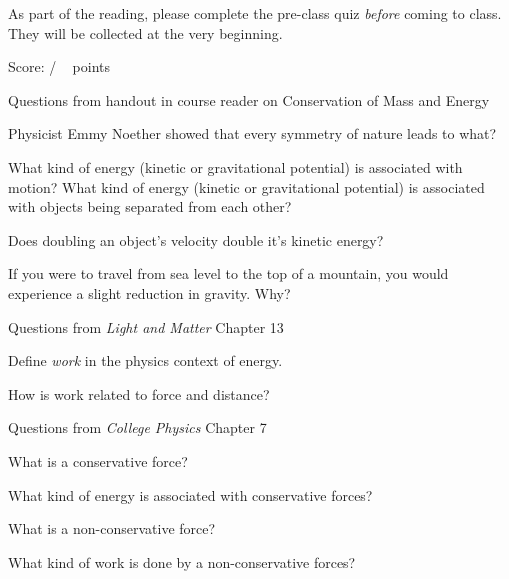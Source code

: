 \documentclass[addpoints,12pt]{exam}
\begin{document}
As part of the reading, please complete the pre-class quiz \textit{before} coming to class. They will be collected at the very beginning.
 
\clearpage

\begin{flushright}
Score: \hspace{0.2in} / \numpoints ~ points
\end{flushright}

\noindent Questions from handout in course reader on Conservation of Mass and Energy

\begin{questions}

\question[1]
Physicist Emmy Noether showed that every symmetry of nature leads to what?
\fillwithlines{0.5in}

\question[1]
What kind of energy (kinetic or gravitational potential) is associated with motion? What kind of energy (kinetic or gravitational potential) is associated with objects being separated from each other?
\fillwithlines{0.5in}

\question[1]
Does doubling an object's velocity double it's kinetic energy?
\fillwithlines{0.5in}

\question[1]
If you were to travel from sea level to the top of a mountain, you would experience a slight reduction in gravity. Why?
\fillwithlines{0.5in}
\end{questions}

\noindent Questions from \textit{Light and Matter} Chapter 13

\begin{questions}

\question[1]
Define \textit{work} in the physics context of energy.
\fillwithlines{0.5in}

\question[1]
How is work related to force and distance?
\fillwithlines{0.5in}

\end{questions}

\noindent Questions from \textit{College Physics} Chapter 7

\begin{questions}

\bonusquestion[1]
What is a conservative force?
\fillwithlines{0.5in}

\bonusquestion[1]
What kind of energy is associated with conservative forces?
\fillwithlines{0.5in}

\bonusquestion[1]
What is a non-conservative force?
\fillwithlines{0.5in}

\bonusquestion[1]
What kind of work is done by a non-conservative forces?
\fillwithlines{0.5in}


\end{questions}
\end{document}
